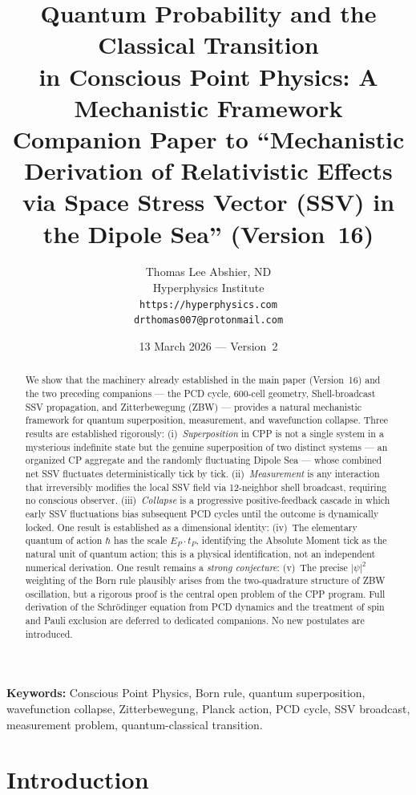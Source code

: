 \documentclass[12pt]{article}
\title{\textbf{Quantum Probability and the Classical Transition\\
in Conscious Point Physics: A Mechanistic Framework}\\[6pt]
{\large Companion Paper to ``Mechanistic Derivation of Relativistic Effects\\
via Space Stress Vector (SSV) in the Dipole Sea'' (Version~16)}}
\author{Thomas Lee Abshier, ND\\
Hyperphysics Institute\\
\texttt{https://hyperphysics.com}\\
\texttt{drthomas007@protonmail.com}}
\date{13 March 2026 --- Version~2}
\newcommand{\EP}{E_P}
\newcommand{\tP}{t_P}
\begin{document}
\maketitle

\noindent\textbf{Keywords:} Conscious Point Physics, Born rule, quantum
superposition, wavefunction collapse, Zitterbewegung, Planck action, PCD
cycle, SSV broadcast, measurement problem, quantum-classical transition.

\begin{abstract}
We show that the machinery already established in the main paper (Version~16)
and the two preceding companions --- the PCD cycle, 600-cell geometry,
Shell-broadcast SSV propagation, and Zitterbewegung (ZBW) --- provides a
natural mechanistic framework for quantum superposition, measurement, and
wavefunction collapse.  Three results are established rigorously:
(i)~\emph{Superposition} in CPP is not a single system in a mysterious
indefinite state but the genuine superposition of two distinct systems ---
an organized CP aggregate and the randomly fluctuating Dipole Sea --- whose
combined net SSV fluctuates deterministically tick by tick.
(ii)~\emph{Measurement} is any interaction that irreversibly modifies the
local SSV field via 12-neighbor shell broadcast, requiring no conscious
observer.
(iii)~\emph{Collapse} is a progressive positive-feedback cascade in which
early SSV fluctuations bias subsequent PCD cycles until the outcome is
dynamically locked.
One result is established as a dimensional identity:
(iv)~The elementary quantum of action $\hbar$ has the scale $\EP\cdot\tP$,
identifying the Absolute Moment tick as the natural unit of quantum action;
this is a physical identification, not an independent numerical derivation.
One result remains a \emph{strong conjecture}:
(v)~The precise $|\psi|^2$ weighting of the Born rule plausibly arises from
the two-quadrature structure of ZBW oscillation, but a rigorous proof is the
central open problem of the CPP program.
Full derivation of the Schr\"odinger equation from PCD dynamics and the
treatment of spin and Pauli exclusion are deferred to dedicated companions.
No new postulates are introduced.
\end{abstract}

\section{Introduction}
\label{sec:intro}
\end{document}
